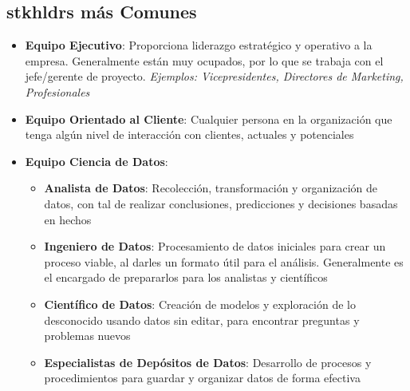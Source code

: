 \subsection{\gls{stkhldrs} más Comunes}
\begin{itemize}
    \item {\textbf{Equipo Ejecutivo}: Proporciona liderazgo estratégico y operativo a la empresa. Generalmente están muy ocupados, por lo que se trabaja con el jefe/gerente de proyecto. \textit{Ejemplos: Vicepresidentes, Directores de Marketing, Profesionales}}
    \item {\textbf{Equipo Orientado al Cliente}: Cualquier persona en la organización que tenga algún nivel de interacción con clientes, actuales y potenciales}
    \item {\textbf{Equipo Ciencia de Datos}: 
    \begin{itemize}
        \item {\textbf{Analista de Datos}: Recolección, transformación y organización de datos, con tal de realizar conclusiones, predicciones y decisiones basadas en hechos}
        \item {\textbf{Ingeniero de Datos}: Procesamiento de datos iniciales para crear un proceso viable, al darles un formato útil para el análisis. Generalmente es el encargado de prepararlos para los analistas y científicos}
        \item {\textbf{Científico de Datos}: Creación de modelos y exploración de lo desconocido usando datos sin editar, para encontrar preguntas y problemas nuevos}
        \item {\textbf{Especialistas de Depósitos de Datos}: Desarrollo de procesos y procedimientos para guardar y organizar datos de forma efectiva}
    \end{itemize}}
\end{itemize}

\newpage